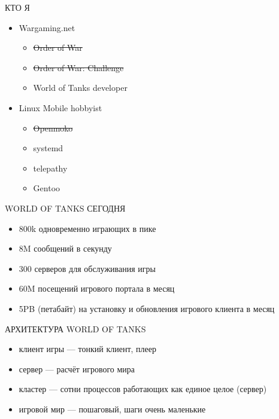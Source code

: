 \documentclass[aspectratio=169]{beamer}
\begin{document}
\begin{frame}{КТО Я}
    \begin{itemize}
        \item Wargaming.net
            \begin{itemize}
                \item \sout{Order of War}
                \item \sout{Order of War: Challenge}
                \item World of Tanks developer
            \end{itemize}
        \item Linux Mobile hobbyist
            \begin{itemize}
                \item \sout{Openmoko}
                \item systemd
                \item telepathy
                \item Gentoo
            \end{itemize}
    \end{itemize}
\end{frame}

\begin{frame}{WORLD OF TANKS СЕГОДНЯ}
    \begin{itemize}
        \item 800k одновременно играющих в пике
        \item 8M сообщений в секунду
        \item 300 серверов для обслуживания игры
        \item 60M посещений игрового портала в месяц
        \item 5PB (петабайт) на установку и обновления игрового клиента в месяц
    \end{itemize}
\end{frame}

\begin{frame}{АРХИТЕКТУРА WORLD OF TANKS}
    \begin{itemize}
        \item клиент игры --- тонкий клиент, плеер
        \item сервер --- расчёт игрового мира
        \item кластер --- сотни процессов работающих как единое целое (сервер)
        \item игровой мир --- пошаговый, шаги очень маленькие
    \end{itemize}
\end{frame}
\end{document}

